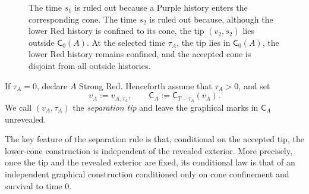 \documentclass[letterpaper,11pt,reqno]{amsart}
\theoremstyle{definition}
\begin{document}
\begin{figure}[t]

\caption{
The time \(s_1\) is ruled out because a Purple history enters the corresponding
cone. The time \(s_2\) is ruled out because, although the lower Red history is
confined to its cone, the tip \((v_2,s_2)\) lies outside \(\mathsf C_0(A)\).
At the selected time \(\tau_A\), the tip lies in \(\mathsf C_0(A)\), the lower
Red history remains confined, and the accepted cone is disjoint from all
outside histories.
}
\end{figure}

If \(\tau_A=0\), declare \(A\) Strong Red. Henceforth assume that
\(\tau_A>0\), and set
\[
v_A:=v_{A,\tau_A},
\qquad
\mathsf C_A:=\mathsf C_{T-\tau_A}(v_A).
\]
We call \((v_A,\tau_A)\) the \emph{separation tip} and leave the graphical
marks in \(\mathsf C_A\) unrevealed.
%



The key feature of the separation rule is that, conditional on the accepted
tip, the lower-cone construction is independent of the revealed exterior.
More precisely, once the tip and the revealed exterior are fixed, its
conditional law is that of an independent graphical construction conditioned
only on cone confinement and survival to time \(0\).
\end{document}
